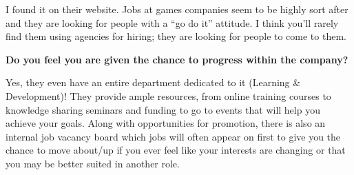 \documentclass{scrartcl}
\begin{document}
\begin{appendices}
I found it on their website. Jobs at games companies seem to be highly sort after and they are looking for people with a “go do it” attitude. I think you’ll rarely find them using agencies for hiring; they are looking for people to come to them.
\par
\textbf{Do you feel you are given the chance to progress within the company?}
\par
Yes, they even have an entire department dedicated to it (Learning \& Development)! They provide ample resources, from online training courses to knowledge sharing seminars and funding to go to events that will help you achieve your goals. Along with opportunities for promotion, there is also an internal job vacancy board which jobs will often appear on first to give you the chance to move about/up if you ever feel like your interests are changing or that you may be better suited in another role.


\end{appendices}



\end{document}
